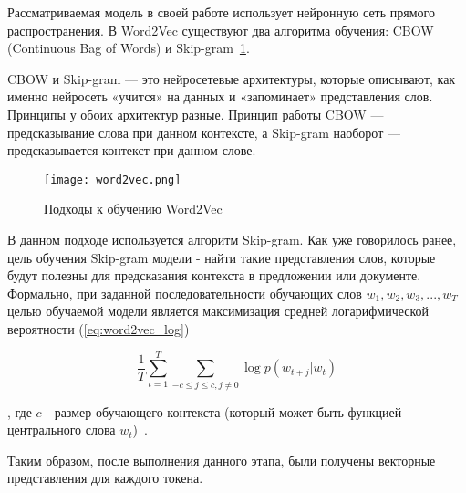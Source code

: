 Рассматриваемая модель в своей работе использует нейронную сеть прямого распространения. В Word2Vec существуют два алгоритма обучения: CBOW (Continuous Bag of Words) и Skip-gram~\ref{fig:word2vec}.


CBOW и Skip-gram — это нейросетевые архитектуры, которые описывают, как именно нейросеть «учится» на данных и «запоминает» представления слов. Принципы у обоих архитектур разные. Принцип работы CBOW — предсказывание слова при данном контексте, а Skip-gram наоборот — предсказывается контекст при данном слове.

\begin{figure}[htbp]
\centering
\texttt{[image: word2vec.png]}
\caption{Подходы к обучению Word2Vec}
\label{fig:word2vec}
\end{figure}

В данном подходе используется алгоритм Skip-gram. Как уже говорилось ранее, цель обучения Skip-gram модели - найти такие представления слов, которые будут полезны для предсказания контекста в предложении или документе. Формально, при заданной последовательности обучающих слов \(w_1, w_2, w_3,...,w_T\) целью обучаемой модели является максимизация средней логарифмической вероятности (\ref{eq:word2vec_log})

\begin{equation}
\label{eq:word2vec_log}
\frac{1}{T}\sum_{t=1}^{T}\sum_{-c \leq j \leq c,j\neq0}\log p(w_{t+j}|w_t)
\end{equation}

, где \(c\) - размер обучающего контекста (который может быть функцией центрального слова \(w_t\))~\cite{word2vec}.

Таким образом, после выполнения данного этапа, были получены векторные представления для каждого токена.


